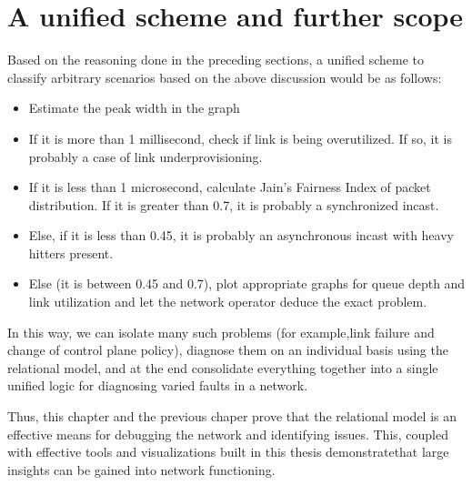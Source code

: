 \section{A unified scheme and further scope}

Based on the reasoning done in the preceding sections, a unified scheme to classify arbitrary scenarios based on the above discussion would be as follows:
\begin{itemize}
	\item Estimate the peak width in the graph
	\item If it is more than 1 millisecond, check if link is being overutilized. If so, it is probably a case of link underprovisioning.
	\item If it is less than 1 microsecond, calculate Jain's Fairness Index of packet distribution. If it is greater than 0.7, it is probably a synchronized incast. 
	\item Else, if it is less than 0.45, it is probably an asynchronous incast with heavy hitters present.
	\item Else (it is between 0.45 and 0.7), plot appropriate graphs for queue depth and link utilization and let the network operator deduce the exact problem.
\end{itemize}

In this way, we can isolate many such problems (for example,link failure 
and change of control plane policy), diagnose them on an individual basis using the relational model,
and at the end consolidate everything together into a single unified logic for diagnosing varied faults in a network.

Thus, this chapter and the previous chaper prove that the relational model is an effective means for debugging
the network and identifying issues. This, coupled with effective tools and visualizations built in this thesis
demonstratethat large insights can be gained into network functioning.

